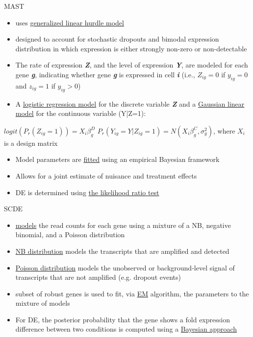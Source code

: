\documentclass{beamer}\usepackage[]{graphicx}\usepackage[]{color}
\begin{document}
\begin{frame}
\begin{block}{MAST}
\vspace{0.5cm}
\scriptsize
\begin{itemize}
  \item uses \underline{generalized linear hurdle model}
  \item designed to account for stochastic dropouts and bimodal expression distribution in which expression is either strongly non-zero or non-detectable
  \item The rate of expression \textbf{\textit{Z}}, and the level of expression \textbf{\textit{Y}}, are modeled for each gene \textbf{\textit{g}}, indicating whether gene \textbf{\textit{g}} is expressed in cell \textbf{\textit{i}} (i.e., $Z_{ig}=0$ if $y_{ig}=0$ and $z_{ig}=1$ if $y_{ig}>0$)
  \item A \underline{logistic regression model} for the discrete variable \textbf{\textit{Z}} and a \underline{Gaussian linear model} for the continuous variable (Y|Z=1):
   \end{itemize}
   \begin{center}
    $logit (P_r(Z_{ig}=1))=X_i\beta_g^D$ \newline
    $P_r(Y_{ig}=Y|Z_{ig}=1)=N(X_i\beta_g^C,\sigma_g^2)$, where $X_i$ is a design matrix
\end{center}
\begin{itemize}
\item Model parameters are \underline{fitted} using an empirical Bayesian framework
\item Allows for a joint estimate of nuisance and treatment effects
\item DE is determined using \underline{the likelihood ratio test}
\end{itemize}
\end{block}
\end{frame}

\begin{frame}
\begin{block}{SCDE}
\vspace{0.5cm}
\scriptsize
\begin{itemize}
  \item \underline{models} the read counts for each gene using a mixture of a NB, negative binomial, and a Poisson distribution
  \item \underline{NB distribution} models the transcripts that are amplified and detected
  \item \underline{Poisson distribution} models the unobserved or background-level signal of transcripts that are not amplified (e.g. dropout events)
  \item subset of robust genes is used to fit, via \underline{EM} algorithm, the parameters to the mixture of models
  \item For DE, the posterior probability that the gene shows a fold expression difference between two conditions is computed using a \underline{Bayesian approach}
\end{itemize}
\end{block}
\end{frame}
\end{document}
